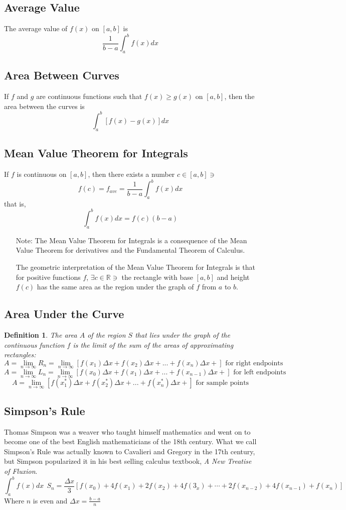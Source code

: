 \documentclass[10pt]{report}
\newtheorem{def3}{Definition}[subsection]
\begin{document}
\subsection{Average Value}
The average value of $f(x)$ on $[a,b]$ is $$\frac{1}{b-a}\int_a^b f(x)dx$$
\subsection{Area Between Curves}
If $f$ and $g$ are continuous functions such that $f(x)\geq g(x)$ on $[a,b]$, then the area between the curves is $$\int_a^b[f(x)-g(x)]dx$$

\subsection{Mean Value Theorem for Integrals}
If $f$ is continuous on $[a,b]$, then there exists a number $c\in[a,b]\ni$
$$f(c)=f_{ave}=\frac{1}{b-a}\int_a^b f(x)dx$$
that is, 
$$\int_a^b f(x)dx = f(c)(b-a)$$
\begin{itemize}
\item[Note:] The Mean Value Theorem for Integrals is a consequence of the Mean Value Theorem for derivatives and the Fundamental Theorem of Calculus. 

The geometric interpretation of the Mean Value Theorem for Integrals is that for positive functions $f$, $\exists c\in \mathbb{R}\ni$ the rectangle with base $[a,b]$ and height $f(c)$ has the same area as the region under the graph of $f$ from $a$ to $b$.
\end{itemize}
\subsection{Area Under the Curve}
\begin{def3}
The area $A$ of the region $S$ that lies under the graph of the continuous function $f$ is the limit of the sum of the areas of approximating rectangles:
$$A=\lim_{n\to\infty}R_n =\lim_{n\to\infty}[f(x_1)\Delta x+f(x_2)\Delta x+ ...+ f(x_n)\Delta x+]\text{ for right endpoints}$$
$$A=\lim_{n\to\infty}L_n =\lim_{n\to\infty}[f(x_0)\Delta x+f(x_1)\Delta x+ ...+ f(x_{n-1})\Delta x+]\text{ for left endpoints}$$
$$A=\lim_{n\to\infty}[f(x_1^*)\Delta x+f(x_2^*)\Delta x+ ...+ f(x_n^*)\Delta x+]\text{ for sample points}$$
\end{def3}
\subsection{Simpson's Rule}
Thomas Simpson was a weaver who taught himself mathematics and went on to become one of the best English mathematicians of the 18th century. What we call Simpson's Rule was actually known to Cavalieri and Gregory in the 17th century, but Simpson popularized it in his best selling calculus textbook, \textit{A New Treatise of Fluxion}.
$$\int_a^bf(x)dx ~~ S_n = \frac{\Delta x}{3}[f(x_0) + 4f(x_1) + 2f(x_2) + 4f(3_x) + \cdots + 2f(x_{n-2}) + 4f(x_{n-1}) + f(x_n)]$$
Where $n$ is even and $\Delta x=\frac{b-a}{n}$
\end{document}
